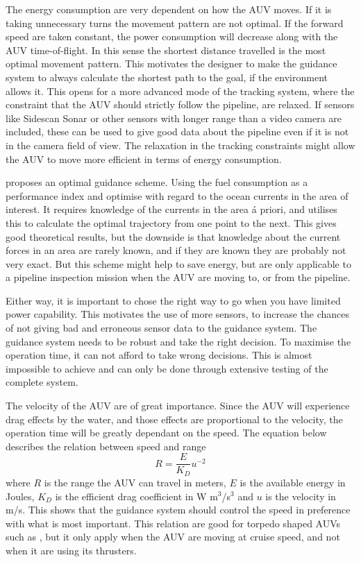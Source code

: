 	The energy consumption are very dependent on how the AUV moves. If it is taking unnecessary turns the
	movement pattern are not optimal. If the forward speed are taken constant, the power consumption will
	decrease along with the AUV time-of-flight. In this sense the shortest distance travelled is the most
	optimal	movement pattern. This motivates the designer to make the guidance system to always calculate
	the shortest 
	path to the goal, if the environment allows it. This opens for a more advanced mode of the tracking
	system, where the constraint that the AUV should strictly follow the pipeline, are relaxed. If sensors
	like Sidescan Sonar or other sensors with longer range than a video camera are included, these can 
	be used to give good data about the pipeline even if it
	is not in the camera field of view. The relaxation in the tracking constraints might allow the AUV to
	move more efficient in terms of energy consumption.
	
	\cite{fuel_optimal_control} proposes an optimal guidance scheme. Using the
	fuel consumption as a performance index and optimise with regard to the ocean currents in the area of
	interest. It requires knowledge of the currents in the area \'a priori, and utilises this to calculate
	the optimal trajectory from one point to the next. This gives good theoretical results, but the
	downside
	is that knowledge about the current forces in an area are rarely known, and if they are known they are
	probably not very exact. But this scheme might help to save energy, but are only applicable to a
	pipeline inspection mission when the AUV are moving to, or from the pipeline.
	
	Either way, it is important to chose the right way to go when you have limited power capability. This
	motivates the use of more sensors, to increase the chances of not giving bad and erroneous sensor data
	to the guidance system. The guidance system needs to be robust and take the right decision. To
	maximise the operation time, it can not afford to take wrong decisions. This is almost impossible to
	achieve and can only be done through extensive testing of the complete system.

	The velocity of the AUV are of great importance. Since the AUV will experience drag effects by the
	water, and those effects are proportional to the velocity, the operation time will be greatly
	dependant on the speed. The equation below describes the relation between speed and range \cite{range}
	\begin{equation}
		R = \frac{E}{K_D} u^{-2}
	\end{equation}
	where $R$ is the range the AUV can travel in meters, $E$ is the available energy in Joules, $K_D$ is
	the efficient drag coefficient in W m$^3$/s$^3$ and $u$ is the velocity in m/s. This shows that the
	guidance system should control the speed in preference with what is most important. This
	relation are good for torpedo shaped AUVs such as \hugin, but it only apply when the AUV are moving
	at cruise speed, and not when it are using its thrusters.


